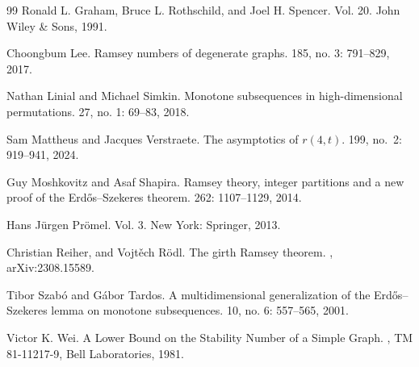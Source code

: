 \begin{thebibliography}{99}
Ronald L. Graham, Bruce L. Rothschild, and Joel H. Spencer. 
 Vol. 20. John Wiley \& Sons, 1991.


Choongbum Lee. 
\newblock Ramsey numbers of degenerate graphs.
 185, no. 3: 791--829, 2017.

Nathan Linial and Michael Simkin. 
\newblock Monotone subsequences in high-dimensional permutations. 
 27, no. 1: 69--83, 2018.

Sam Mattheus and Jacques Verstraete. 
\newblock The asymptotics of $r(4,t)$.
 199, no.~2: 919–941,  2024.


Guy Moshkovitz and Asaf Shapira. 
\newblock Ramsey theory, integer partitions and a new proof of the Erdős–Szekeres theorem. 
 262: 1107--1129, 2014.

Hans Jürgen Prömel. 
 Vol. 3. New York: Springer, 2013.

Christian Reiher, and Vojt\v{e}ch R\"odl. 
\newblock The girth Ramsey theorem.
, arXiv:2308.15589.

Tibor Szab\'{o} and G\'{a}bor Tardos. 
\newblock A multidimensional generalization of the Erd\H{o}s–Szekeres lemma on monotone subsequences.
 10, no. 6: 557--565, 2001.

Victor K. Wei. 
\newblock A Lower Bound on the Stability Number of a Simple Graph.
, TM 81-11217-9, Bell Laboratories, 1981.

\end{thebibliography}